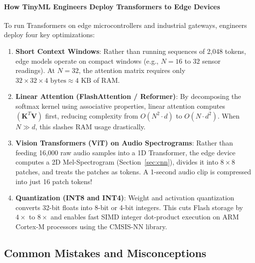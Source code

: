 \paragraph{How TinyML Engineers Deploy Transformers to Edge Devices}
To run Transformers on edge microcontrollers and industrial gateways, engineers deploy four key optimizations:
\begin{enumerate}
    \item \textbf{Short Context Windows}: Rather than running sequences of 2,048 tokens, edge models operate on compact windows (e.g., $N = 16$ to $32$ sensor readings). At $N = 32$, the attention matrix requires only $32 \times 32 \times 4 \text{ bytes} \approx 4 \text{ KB}$ of RAM.
    \item \textbf{Linear Attention (FlashAttention / Reformer)}: By decomposing the softmax kernel using associative properties, linear attention computes $(\mathbf{K}^T \mathbf{V})$ first, reducing complexity from $O(N^2 \cdot d)$ to $O(N \cdot d^2)$. When $N \gg d$, this slashes RAM usage drastically.
    \item \textbf{Vision Transformers (ViT) on Audio Spectrograms}: Rather than feeding 16,000 raw audio samples into a 1D Transformer, the edge device computes a 2D Mel-Spectrogram (Section~\ref{sec:cnn}), divides it into $8 \times 8$ patches, and treats the patches as tokens. A 1-second audio clip is compressed into just 16 patch tokens!
    \item \textbf{Quantization (INT8 and INT4)}: Weight and activation quantization converts 32-bit floats into 8-bit or 4-bit integers. This cuts Flash storage by $4\times$ to $8\times$ and enables fast SIMD integer dot-product execution on ARM Cortex-M processors using the CMSIS-NN library.
\end{enumerate}

\subsection{Common Mistakes and Misconceptions}\label{subsec:mistakes}

